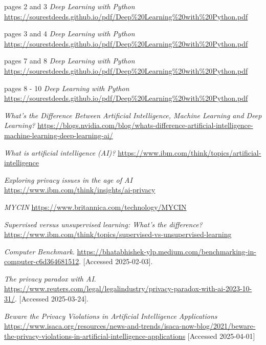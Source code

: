 \documentclass[licencjacka,en]{pracamgr}
\begin{document}
\begin{thebibliography}{99}
    pages 2 and 3
    \textit{Deep Learning with Python}
    \url{https://sourestdeeds.github.io/pdf/Deep%20Learning%20with%20Python.pdf}
    
    pages 3 and 4
    \textit{Deep Learning with Python}
    \url{https://sourestdeeds.github.io/pdf/Deep%20Learning%20with%20Python.pdf}
    
    pages 7 and 8
    \textit{Deep Learning with Python}
    \url{https://sourestdeeds.github.io/pdf/Deep%20Learning%20with%20Python.pdf}
    
    pages 8 - 10
    \textit{Deep Learning with Python}
    \url{https://sourestdeeds.github.io/pdf/Deep%20Learning%20with%20Python.pdf}
    
    \textit{What’s the Difference Between Artificial Intelligence, Machine Learning and Deep Learning?}
    \url{https://blogs.nvidia.com/blog/whats-difference-artificial-intelligence-machine-learning-deep-learning-ai/}
    
    \textit{What is artificial intelligence (AI)?}
    \url{https://www.ibm.com/think/topics/artificial-intelligence}
    
    \textit{Exploring privacy issues in the age of AI}
    \url{https://www.ibm.com/think/insights/ai-privacy}
    
    \textit{MYCIN}
    \url{https://www.britannica.com/technology/MYCIN}
    
    \textit{Supervised versus unsupervised learning: What's the difference?}
    \url{https://www.ibm.com/think/topics/supervised-vs-unsupervised-learning}
    
    \textit{Computer Benchmark}.
    \url{https://bhatabhishek-ylp.medium.com/benchmarking-in-computer-c6d364681512}.
    [Accessed 2025-02-03].
    
    \textit{The privacy paradox with AI}.
    \url{https://www.reuters.com/legal/legalindustry/privacy-paradox-with-ai-2023-10-31/}.
    [Accessed 2025-03-24].
    
    \textit{Beware the Privacy Violations in Artificial Intelligence Applications}
    \url{https://www.isaca.org/resources/news-and-trends/isaca-now-blog/2021/beware-the-privacy-violations-in-artificial-intelligence-applications}
    [Accessed 2025-04-01]
    

\end{thebibliography}
\end{document}

